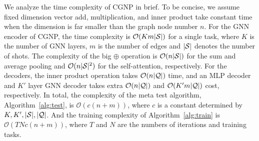  We analyze the time complexity of CGNP in brief. To be concise, we assume fixed dimension vector add, multiplication, and inner product take constant time when the dimension is far smaller than the graph node number $n$. 
For the GNN encoder of CGNP, the time complexity is $\mathcal{O}(K m |\mathcal{S}|)$ for a single task, where $K$ is the number of GNN layers, $m$ is the number of edges and $|\mathcal{S}|$ denotes the number of shots.   
The complexity of the big $\oplus$ operation is $\mathcal{O}(n |\mathcal{S}|)$ for the sum and average pooling and $\mathcal{O}(n |\mathcal{S}|^2)$ for the self-attention, respectively.  
For the decoders, the inner product operation takes $\mathcal{O}(n |\mathcal{Q}|)$ time, and an MLP decoder and $K'$ layer GNN decoder takes extra $\mathcal{O}(n |\mathcal{Q}|)$ and $\mathcal{O}(K' m |\mathcal{Q}|)$ cost, respectively.
In total, the complexity of the meta test algorithm, Algorithm~\ref{alg:test},  is $\mathcal{O}(c (n + m))$, where $c$ is a constant determined by $K, K', |\mathcal{S}|, |\mathcal{Q}|$. And the training complexity of Algorithm~\ref{alg:train} is $\mathcal{O}(TNc(n + m))$, where $T$ and $N$ are the numbers of iterations and training tasks. 




